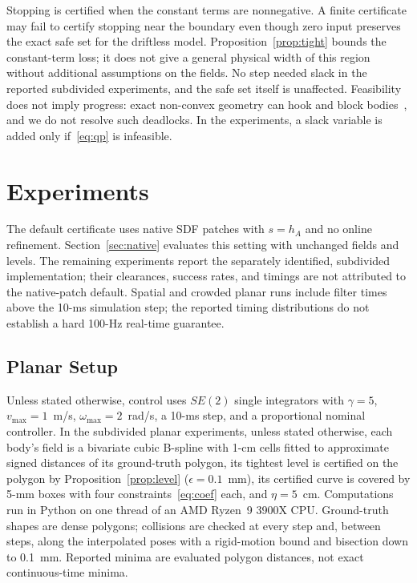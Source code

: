 \documentclass[journal]{IEEEtran}
\theoremstyle{definition}
\begin{document}
Stopping is certified when the constant terms are nonnegative. A finite certificate may fail to
certify stopping near the boundary even though zero input preserves the exact safe set for the
driftless model. Proposition~\ref{prop:tight} bounds the constant-term loss; it does not give a
general physical width of this region without additional assumptions on the fields.
No step needed slack in the reported subdivided experiments, and the safe set itself is unaffected.
Feasibility does not imply progress: exact non-convex geometry can hook and block
bodies~\cite{reis2020undesirable}, and we do not resolve such deadlocks. In the experiments, a slack
variable is added only if~\eqref{eq:qp} is infeasible.

\section{Experiments}\label{sec:exp}

The default certificate uses native SDF patches with $s=h_A$ and no online refinement.
Section~\ref{sec:native} evaluates this setting with unchanged fields and levels.
The remaining experiments report the separately identified, subdivided implementation; their
clearances, success rates, and timings are not attributed to the native-patch default.
Spatial and crowded planar runs include filter times above the 10-ms simulation step;
the reported timing distributions do not establish a hard 100-Hz real-time guarantee.

\subsection{Planar Setup}
Unless stated otherwise, control uses $SE(2)$ single integrators with $\gamma=5$,
$v_{\max}=1$~m/s, $\omega_{\max}=2$~rad/s,
a 10-ms step, and a proportional nominal controller. In the subdivided planar experiments,
unless stated otherwise, each body's field is a
bivariate cubic B-spline with 1-cm cells fitted to approximate signed distances of its ground-truth polygon,
its tightest level is certified on the polygon by Proposition~\ref{prop:level} ($\epsilon=0.1$~mm),
its certified curve is covered by 5-mm boxes with four constraints~\eqref{eq:coef} each, and
$\eta=5$~cm. Computations run in Python on one thread of an AMD Ryzen~9 3900X CPU. Ground-truth
shapes are dense polygons; collisions are checked at every step and, between steps, along the
interpolated poses with a rigid-motion bound and bisection down to 0.1~mm.
Reported minima are evaluated polygon distances, not exact continuous-time minima.
\end{document}
